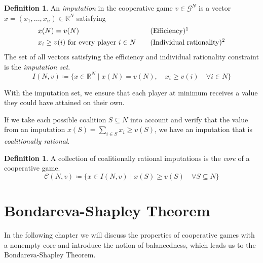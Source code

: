 \documentclass[10pt,a4paper,titlepage]{article}
\theoremstyle{plain}
\theoremstyle{definition}
\newtheorem{defn}[thm]{Definition} %
\begin{document}
\begin{defn}
    An \textit{imputation} in the cooperative game $v \in \mathcal{G}^N$ is a vector $x = (x_1, ..., x_n) \in \mathbb{R}^N$ satisfying
    \[
        \begin{aligned}
            &x(N) = v(N) && \quad \text{(Efficiency)}\footnotemark\\
            &x_i \geq v(i)\text{ for every player } i \in N && \quad \text{(Individual rationality)\footnotemark}
        \end{aligned}
    \]
    The set of all vectors satisfying the efficiency and individual rationality constraint is the \textit{imputation set}.
    \begin{equation}\label{eq:imputation}
        I(N, v) \coloneqq \{x \in \mathbb{R}^N \mid x(N) = v(N),\quad x_i \geq v(i) \quad \forall i \in N\}
    \end{equation}
\end{defn}

With the imputation set, we ensure that each player at minimum receives a value they could have attained on their own.

If we take each possible coalition $S \subseteq N$ into account and verify that the value from an imputation $x(S) = \sum_{i \in S}x_i \geq v(S)$, we have an imputation that is \textit{coalitionally rational}.

\begin{defn}\label{def:core}
    A collection of coalitionally rational imputations is the \textit{core} of a cooperative game.
    \begin{equation}\label{eq:core}
        \mathcal{C}(N, v) \coloneqq \{x \in I(N, v) \mid x(S) \geq v(S)\quad \forall S \subseteq N\}
    \end{equation}
\end{defn}

 \section{Bondareva-Shapley Theorem}
 In the following chapter we will discuss the properties of cooperative games with a nonempty core and introduce the notion of balancedness, which leads us to the Bondareva-Shapley Theorem.
\end{document}
